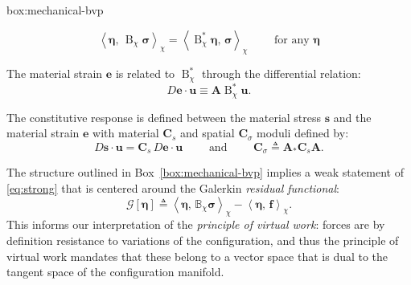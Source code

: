 \begin{ambox}{box:mechanical-bvp}
{\begin{description}
\begin{equation}
  \left<\bm{\eta},\, \operatorname{B}_\chi\bm{\sigma}\right>_\chi = \left<\operatorname{B}_\chi^*\bm{\eta},\, \bm{\sigma}\right>_\chi
  \qquad \text{ for any }\bm{\eta}
  \label{eq:def-adjoint}
\end{equation}
%
\item[Strain]
The material strain \(\bm{e}\) is related to 
\(\operatorname{B}^*_\chi\) through the differential relation: 
\begin{equation}
  D\bm{e}\cdot\bm{u} \equiv \bm{A}\operatorname{B}^*_\chi \bm{u}.
  \label{eq:vstrain}
\end{equation}
%
\item[Constitution]
The constitutive response is defined between the material stress
\(\bm{s}\) and the material strain \(\bm{e}\) with material \(\bm{C}_s\) and
spatial \(\bm{C}_\sigma\) moduli defined by:
\begin{equation}
  D \bm{s}\cdot \bm{u} = \bm{C}_s \, D \bm{e}\cdot {\bm{u}}
  \qquad\text{ and }\qquad
  \bm{C}_\sigma \triangleq \bm{A}_*\bm{C}_s\bm{A}.
  \label{eq:def-moduli}
\end{equation}
\end{description}
}
\end{ambox}

The structure outlined in Box~\ref{box:mechanical-bvp} 
implies a weak statement
of \eqref{eq:strong} that is centered around the Galerkin \emph{residual functional}:
%
\begin{equation}
\mathcal{G}\left[\bm{\eta}\right] \triangleq \left< \bm{\eta}, \, \mathbb{B}_\chi \bm{\sigma}\right>_\chi - \left< \bm{\eta}, \, \bm{f}\right>_\chi.
\label{eq:galerkin}
\end{equation}
This informs our interpretation of the \emph{principle of virtual work}: forces are by definition resistance to variations of the configuration, and thus the principle of virtual work mandates that these belong to a vector space that is dual to the tangent space of the configuration manifold.



